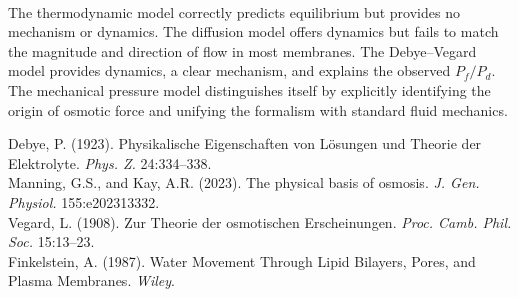 \begin{technical}
\\[0.5em]
The thermodynamic model correctly predicts equilibrium but provides no mechanism or dynamics. The diffusion model offers dynamics but fails to match the magnitude and direction of flow in most membranes. The Debye–Vegard model provides dynamics, a clear mechanism, and explains the observed $P_f / P_d$. The mechanical pressure model distinguishes itself by explicitly identifying the origin of osmotic force and unifying the formalism with standard fluid mechanics.

\techref
{\footnotesize
Debye, P. (1923). Physikalische Eigenschaften von Lösungen und Theorie der Elektrolyte. \textit{Phys. Z.} 24:334–338.\\
Manning, G.S., and Kay, A.R. (2023). The physical basis of osmosis. \textit{J. Gen. Physiol.} 155:e202313332.\\
Vegard, L. (1908). Zur Theorie der osmotischen Erscheinungen. \textit{Proc. Camb. Phil. Soc.} 15:13–23.\\
Finkelstein, A. (1987). Water Movement Through Lipid Bilayers, Pores, and Plasma Membranes. \textit{Wiley}.
}
\end{technical}
